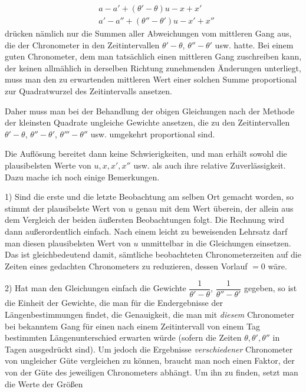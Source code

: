 \[
\begin{aligned}
&a-a'+(\theta'-\theta)u-x+x'\\
&a'-a''+(\theta''-\theta')u-x'+x''
\end{aligned}
\]
\noindent drücken nämlich nur die Summen aller Abweichungen vom mittleren Gang aus, die der Chronometer in den Zeitintervallen $\theta'-\theta$, $\theta''-\theta'$ usw. hatte. Bei einem guten Chronometer, dem man tatsächlich einen mittleren Gang zuschreiben kann, der keinen allmählich in derselben Richtung zunehmenden Änderungen unterliegt, muss man den zu erwartenden mittleren Wert einer solchen Summe proportional zur Quadratwurzel des Zeitintervalls ansetzen.

Daher muss man bei der Behandlung der obigen Gleichungen nach der Methode der kleinsten Quadrate ungleiche Gewichte ansetzen, die zu den Zeitintervallen $\theta'-\theta$, $\theta''-\theta'$, $\theta'''-\theta''$ usw. umgekehrt proportional sind.

Die Auflösung bereitet dann keine Schwierigkeiten, und man erhält sowohl die plausibelsten Werte von $u, x, x', x''$ usw. als auch ihre relative Zuverlässigkeit. Dazu mache ich noch einige Bemerkungen.

1) Sind die erste und die letzte Beobachtung am selben Ort gemacht worden, so stimmt der plausibelste Wert von $u$ genau mit dem Wert überein, der allein aus dem Vergleich der beiden äußersten Beobachtungen folgt. Die Rechnung wird dann außerordentlich einfach. Nach einem leicht zu beweisenden Lehrsatz darf man diesen plausibelsten Wert von $u$ unmittelbar in die Gleichungen einsetzen. Das ist gleichbedeutend damit, sämtliche beobachteten Chronometerzeiten auf die Zeiten eines gedachten Chronometers zu reduzieren, dessen Vorlauf $=0$ wäre.

2) Hat man den Gleichungen einfach die Gewichte $\dfrac{1}{\theta'-\theta}$, $\dfrac{1}{\theta''-\theta'}$ gegeben, so ist die Einheit der Gewichte, die man für die Endergebnisse der Längenbestimmungen findet, die Genauigkeit, die man mit \emph{diesem} Chronometer bei bekanntem Gang für einen nach einem Zeitintervall von einem Tag bestimmten Längenunterschied erwarten würde (sofern die Zeiten $\theta, \theta', \theta''$ in Tagen ausgedrückt sind). Um jedoch die Ergebnisse \emph{verschiedener} Chronometer von ungleicher Güte vergleichen zu können, braucht man noch einen Faktor, der von der Güte des jeweiligen Chronometers abhängt. Um ihn zu finden, setzt man die Werte der Größen


